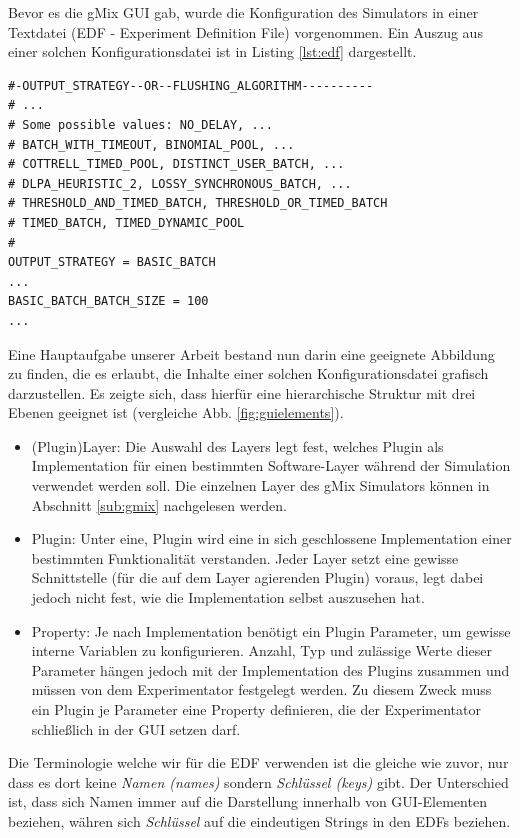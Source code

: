\documentclass[a4paper, 11pt]{article} %
\begin{document}
Bevor es die gMix GUI gab, wurde die Konfiguration des Simulators in einer Textdatei (EDF - Experiment Definition File) vorgenommen. Ein Auszug aus einer solchen Konfigurationsdatei ist in Listing \ref{lst:edf} dargestellt. 

\newpage

\begin{lstlisting}[caption={Auszug aus einer Simulator Konfiguration},label=lst:edf,frame=lrtb]
#-OUTPUT_STRATEGY--OR--FLUSHING_ALGORITHM----------
# ...
# Some possible values: NO_DELAY, ... 
# BATCH_WITH_TIMEOUT, BINOMIAL_POOL, ... 
# COTTRELL_TIMED_POOL, DISTINCT_USER_BATCH, ... 
# DLPA_HEURISTIC_2, LOSSY_SYNCHRONOUS_BATCH, ...
# THRESHOLD_AND_TIMED_BATCH, THRESHOLD_OR_TIMED_BATCH 
# TIMED_BATCH, TIMED_DYNAMIC_POOL
#	
OUTPUT_STRATEGY = BASIC_BATCH
...
BASIC_BATCH_BATCH_SIZE = 100
...
\end{lstlisting}

Eine Hauptaufgabe unserer Arbeit bestand nun darin eine geeignete Abbildung zu finden, die es erlaubt, die Inhalte einer solchen Konfigurationsdatei grafisch darzustellen. Es zeigte sich, dass hierfür eine hierarchische Struktur mit drei Ebenen geeignet ist (vergleiche Abb. \ref{fig:guielements}).

\begin{itemize}
	\item (Plugin)Layer: Die Auswahl des Layers legt fest, welches Plugin als Implementation für einen bestimmten Software-Layer während der Simulation verwendet werden soll. Die einzelnen Layer des gMix Simulators können in Abschnitt \ref{sub:gmix} nachgelesen werden. 
	\item Plugin: Unter eine, Plugin wird eine in sich geschlossene Implementation einer bestimmten Funktionalität verstanden. Jeder Layer setzt eine gewisse Schnittstelle (für die auf dem Layer agierenden Plugin) voraus, legt dabei jedoch nicht fest, wie die Implementation selbst auszusehen hat.
	\item Property: Je nach Implementation benötigt ein Plugin Parameter, um gewisse interne Variablen zu konfigurieren. Anzahl, Typ und zulässige Werte dieser Parameter hängen jedoch mit der Implementation des Plugins zusammen und müssen von dem Experimentator festgelegt werden. Zu diesem Zweck muss ein Plugin je Parameter eine Property definieren, die der Experimentator schließlich in der GUI setzen darf.
\end{itemize} 

Die Terminologie welche wir für die EDF verwenden ist die gleiche wie zuvor, nur dass es dort keine \emph{Namen (names)} sondern \emph{Schlüssel (keys)} gibt. Der Unterschied ist, dass sich Namen immer auf die Darstellung innerhalb von GUI-Elementen beziehen, währen sich \emph{Schlüssel} auf die eindeutigen Strings in den EDFs beziehen.
\end{document}
